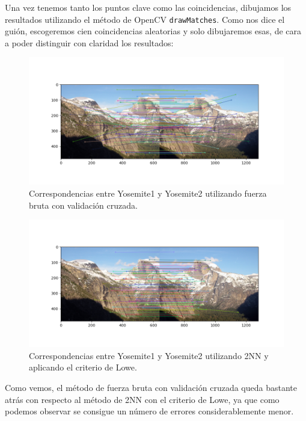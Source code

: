 \documentclass[12pt, spanish]{article}
\begin{document}
Una vez tenemos tanto los puntos clave como las coincidencias, dibujamos los resultados utilizando el método de OpenCV \texttt{drawMatches}\cite{drawMatches}. Como nos dice el guión, escogeremos cien coincidencias aleatorias y solo dibujaremos esas, de cara a poder distinguir con claridad los resultados:

\begin{figure}[H]
  \centering
      \includegraphics[width=\textwidth]{correspondencias_fuerza_bruta.png}
 		\caption{Correspondencias entre Yosemite1 y Yosemite2 utilizando fuerza bruta con validación cruzada.}
\end{figure}

\begin{figure}[H]
  \centering
      \includegraphics[width=\textwidth]{correspondencias_lowe_2nn.png}
 		\caption{Correspondencias entre Yosemite1 y Yosemite2 utilizando 2NN y aplicando el criterio de Lowe.}
\end{figure}


Como vemos, el método de fuerza bruta con validación cruzada queda bastante atrás con respecto al método de 2NN con el criterio de Lowe, ya que como podemos observar se consigue un número de errores considerablemente menor.
\end{document}
